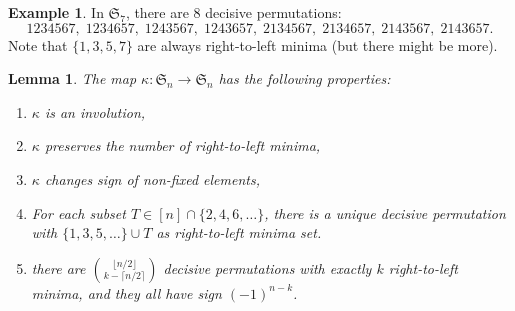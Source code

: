 \documentclass[reqno]{amsart}
\newtheorem{lemma}[theorem]{Lemma}
\theoremstyle{definition}
\newtheorem{example}[theorem]{Example}
\newcommand{\symS}{\mathfrak{S}}
\begin{document}
\begin{example}
In $\symS_7$, there are $8$ decisive permutations:
\[
1234567,\;
1234657,\;
1243567,\;
1243657,\;
2134567,\;
2134657,\;
2143567,\;
2143657.
\]
Note that $\{1,3,5,7\}$ are always right-to-left minima (but there might be more).
\end{example}

\begin{lemma}\label{lem:ltrMinEvenOdd}
The map $\kappa : \symS_n \to \symS_n$ has the following properties:
\begin{enumerate}[label=({\roman*})]
 \item \label{it:kappaprop1} $\kappa$ is an involution,
 \item \label{it:kappaprop2} $\kappa$ preserves the number of right-to-left minima,
 \item \label{it:kappaprop3} $\kappa$ changes sign of non-fixed elements,
\item \label{it:kappaprop4} 
 For each subset $T \in [n] \cap \{2,4,6,\dotsc\}$,
 there is a unique decisive permutation with 
 $\{1,3,5,\dotsc\} \cup T$ as right-to-left minima set.
  
 \item \label{it:kappaprop5} 
 there are $\binom{ \lfloor n/2 \rfloor }{k - \lceil n/2 \rceil}$
 decisive permutations with exactly $k$ right-to-left minima,
 and they all have sign $(-1)^{n-k}$.
 \end{enumerate}
\end{lemma}
\end{document}
